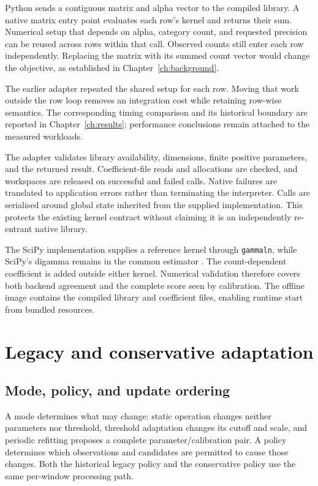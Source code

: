 Python sends a contiguous matrix and alpha vector to the compiled
library. A native matrix entry point evaluates each row's kernel and
returns their sum. Numerical setup that depends on alpha, category count,
and requested precision can be reused across rows within that call.
Observed counts still enter each row independently. Replacing the matrix
with its summed count vector would change the objective, as established
in Chapter~\ref{ch:background}.

The earlier adapter repeated the shared setup for each row. Moving that
work outside the row loop removes an integration cost while retaining
row-wise semantics. The corresponding timing comparison and its historical
boundary are reported in Chapter~\ref{ch:results}; performance conclusions
remain attached to the measured workloads.

The adapter validates library availability, dimensions, finite positive
parameters, and the returned result. Coefficient-file reads and allocations
are checked, and workspaces are released on successful and failed calls.
Native failures are translated to application errors rather than
terminating the interpreter. Calls are serialised around global state
inherited from the supplied implementation. This protects the existing
kernel contract without claiming it is an independently re-entrant native
library.

The SciPy implementation supplies a reference kernel through
\texttt{gammaln}, while SciPy's digamma remains in the common estimator
\cite{virtanen2020}. The count-dependent coefficient is added outside
either kernel. Numerical validation therefore covers both backend agreement
and the complete score seen by calibration. The offline image contains
the compiled library and coefficient files, enabling runtime start from
bundled resources.

\section{Legacy and conservative adaptation}
\label{sec:adaptation}

\subsection{Mode, policy, and update ordering}

A mode determines what may change: static operation changes neither
parameters nor threshold, threshold adaptation changes its cutoff and
scale, and periodic refitting proposes a complete parameter/calibration
pair. A policy determines which observations and candidates are permitted
to cause those changes. Both the historical legacy policy and the
conservative policy use the same per-window processing path.

